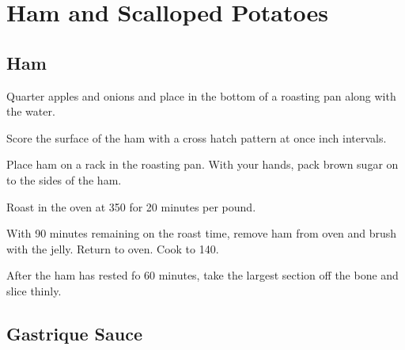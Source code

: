 
\section{Ham and Scalloped Potatoes}
\begin{recipe}


\subsection{Ham}



Quarter apples and onions and place in the bottom of a roasting pan along with the water.

Score the surface of the ham with a cross hatch pattern at once inch intervals.

Place ham on a rack in the roasting pan. With your hands, pack brown sugar on to the sides of the ham.

Roast in the oven at 350\degree{} for 20 minutes per pound.


With 90 minutes remaining on the roast time, remove ham from oven and brush with the jelly. Return to oven. Cook to 140\degree{}. 

After the ham has rested fo 60 minutes, take the largest section off the bone and slice thinly.

\subsection{Gastrique Sauce}



\end{recipe}
